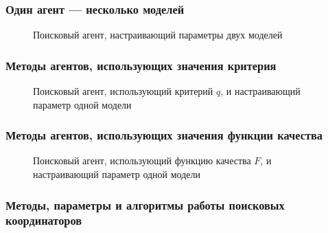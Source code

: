 \documentclass[10pt,utf8]{beamer}
\begin{document}

\begin{frame}
  \frametitle{Один агент --- несколько моделей}


  \begin{figure}[htb!]
    \begin{center}
      
    \end{center}
    \caption{Поисковый агент, настраивающий параметры двух моделей}
    \label{atu:f:agent2}
  \end{figure}


\end{frame}




\begin{frame}
  \frametitle{Методы агентов, использующих значения критерия}

  \begin{figure}[htb!]
  \begin{center}
  
  \end{center}
  \caption{Поисковый агент, использующий критерий $q$, и настраивающий параметр одной модели}
  \label{atu:f:agent1q}
  \end{figure}


\end{frame}



\begin{frame}
  \frametitle{Методы агентов, использующих значения функции качества}

  \begin{figure}[htb!]
  \begin{center}
  
  \end{center}
  \caption{Поисковый агент, использующий функцию качества $F$, и настраивающий параметр одной модели}
  \label{atu:f:agent1}
  \end{figure}


\end{frame}





\begin{frame}
  \frametitle{Методы, параметры и алгоритмы работы поисковых координаторов }


\end{frame}
\end{document}
